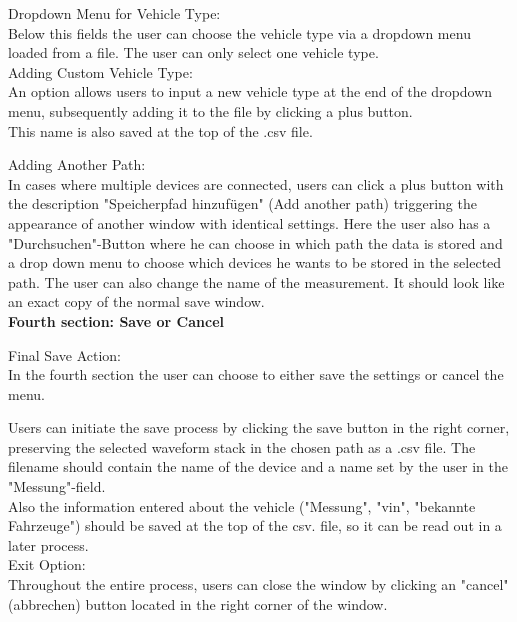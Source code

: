 \documentclass{scrreprt}
\begin{document}
Dropdown Menu for Vehicle Type:\\

Below this fields the user can choose the vehicle type via a dropdown menu loaded from a file. The user can only select one vehicle type.\\

Adding Custom Vehicle Type:\\

An option allows users to input a new vehicle type at the end of the dropdown menu, subsequently adding it to the file by clicking a plus button.\\

This name is also saved at the top of the .csv file. 


Adding Another Path:\\

In cases where multiple devices are connected, users can click a plus button with the description "Speicherpfad hinzufügen" (Add another path) triggering the appearance of another window with identical settings. Here the user also has a "Durchsuchen"-Button where he can choose in which path the data is stored and a drop down menu to choose which devices he wants to be stored in the selected path. The user can also change the name of the measurement. It should look like an exact copy of the normal save window.\\

\textbf{Fourth section: Save or Cancel}

Final Save Action:\\
In the fourth section the user can choose to either save the settings or cancel the menu. 

Users can initiate the save process by clicking the save button in the right corner, preserving the selected waveform stack in the chosen path as a .csv file. The filename should contain the name of the device and a name set by the user in the "Messung"-field.\\
Also the information entered about the vehicle ("Messung", "vin", "bekannte Fahrzeuge") should be saved at the top of the csv. file, so it can be read out in a later process.\\

Exit Option:\\

Throughout the entire process, users can close the window by clicking an "cancel" (abbrechen) button located in the right corner of the window.\\
\end{document}
